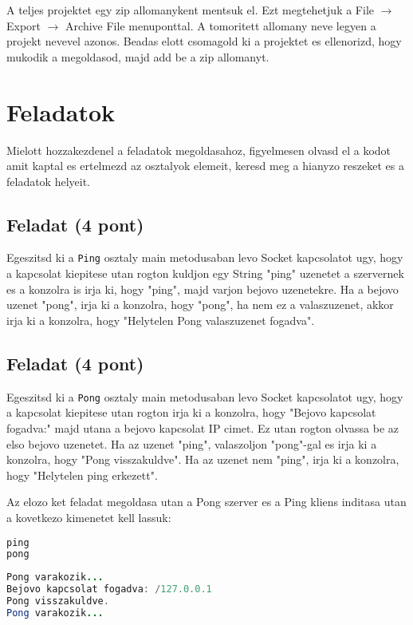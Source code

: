 \documentclass{article}
\begin{document}
    A teljes projektet egy zip allomanykent mentsuk el. Ezt megtehetjuk a File $\rightarrow$ Export $\rightarrow$ Archive File menuponttal. A tomoritett allomany neve legyen a projekt nevevel azonos. Beadas elott csomagold ki a projektet es ellenorizd, hogy mukodik a megoldasod, majd add be a zip allomanyt.

\section{Feladatok}

Mielott hozzakezdenel a feladatok megoldasahoz, figyelmesen olvasd el a kodot amit kaptal es ertelmezd az osztalyok elemeit, keresd meg a hianyzo reszeket es a feladatok helyeit.

\subsection{Feladat (4 pont)}
Egeszitsd ki a \lstinline{Ping} osztaly main metodusaban levo Socket kapcsolatot ugy, hogy a kapcsolat kiepitese utan rogton kuldjon egy String "ping" uzenetet a szervernek es a konzolra is irja ki, hogy "ping", majd varjon bejovo uzenetekre. Ha a bejovo uzenet "pong", irja ki a konzolra, hogy "pong", ha nem ez a valaszuzenet, akkor irja ki a konzolra, hogy "Helytelen Pong valaszuzenet fogadva".

\subsection{Feladat (4 pont)}
Egeszitsd ki a \lstinline{Pong} osztaly main metodusaban levo Socket kapcsolatot ugy, hogy a kapcsolat kiepitese utan rogton irja ki a konzolra, hogy "Bejovo kapcsolat fogadva:" majd utana a bejovo kapcsolat IP cimet. Ez utan rogton olvassa be az elso bejovo uzenetet. Ha az uzenet "ping", valaszoljon "pong"-gal es irja ki a konzolra, hogy "Pong visszakuldve". Ha az uzenet nem "ping", irja ki a konzolra, hogy "Helytelen ping erkezett".

Az elozo ket feladat megoldasa utan a Pong szerver es a Ping kliens inditasa utan a kovetkezo kimenetet kell lassuk:

\begin{lstlisting}[language=Java, caption=Ping]
ping
pong
\end{lstlisting}

\begin{lstlisting}[language=Java, caption=Pong]
Pong varakozik...
Bejovo kapcsolat fogadva: /127.0.0.1
Pong visszakuldve.
Pong varakozik...
\end{lstlisting}
\end{document}
